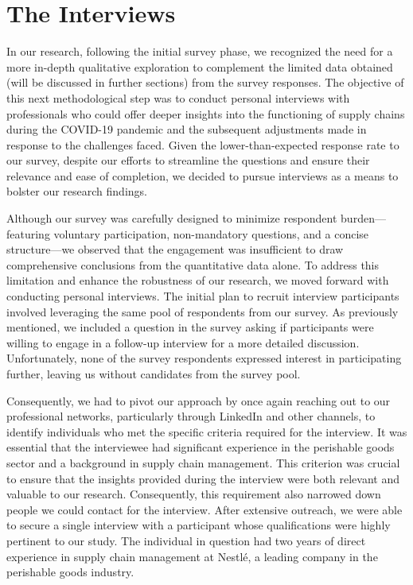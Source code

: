 \section{The Interviews}

In our research, following the initial survey phase, we recognized the need for a more in-depth qualitative exploration to complement the limited data obtained (will be discussed in further sections) from the survey responses. The objective of this next methodological step was to conduct personal interviews with professionals who could offer deeper insights into the functioning of supply chains during the COVID-19 pandemic and the subsequent adjustments made in response to the challenges faced. Given the lower-than-expected response rate to our survey, despite our efforts to streamline the questions and ensure their relevance and ease of completion, we decided to pursue interviews as a means to bolster our research findings. 

Although our survey was carefully designed to minimize respondent burden—featuring voluntary participation, non-mandatory questions, and a concise structure—we observed that the engagement was insufficient to draw comprehensive conclusions from the quantitative data alone. To address this limitation and enhance the robustness of our research, we moved forward with conducting personal interviews. The initial plan to recruit interview participants involved leveraging the same pool of respondents from our survey. As previously mentioned, we included a question in the survey asking if participants were willing to engage in a follow-up interview for a more detailed discussion. Unfortunately, none of the survey respondents expressed interest in participating further, leaving us without candidates from the survey pool.

Consequently, we had to pivot our approach by once again reaching out to our professional networks, particularly through LinkedIn and other channels, to identify individuals who met the specific criteria required for the interview. It was essential that the interviewee had significant experience in the perishable goods sector and a background in supply chain management. This criterion was crucial to ensure that the insights provided during the interview were both relevant and valuable to our research. Consequently, this requirement also narrowed down people we could contact for the interview. After extensive outreach, we were able to secure a single interview with a participant whose qualifications were highly pertinent to our study. The individual in question had two years of direct experience in supply chain management at Nestlé, a leading company in the perishable goods industry. 

